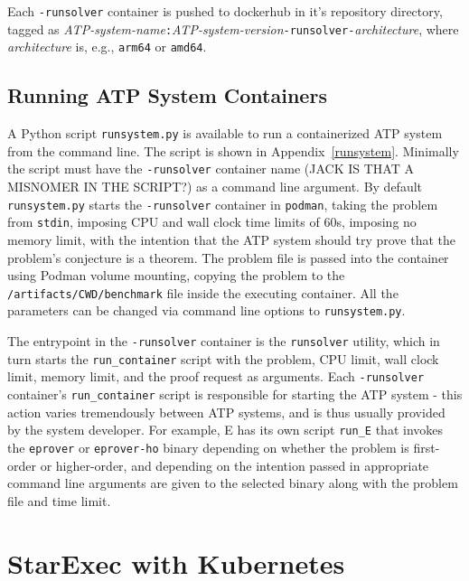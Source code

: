 \documentclass{easychair}
\begin{document}
Each {\tt -runsolver} container is pushed to dockerhub in it's repository directory, tagged
as {\em ATP-system-name}{\tt :}{\em ATP-system-version}{\tt -runsolver-}{\em architecture},
where {\em architecture} is, e.g., {\tt arm64} or {\tt amd64}.

\subsection{Running ATP System Containers}
\label{Running}

A Python script {\tt runsystem.py} is available to run a containerized ATP system from the 
command line.
The script is shown in Appendix~\ref{runsystem}.
Minimally the script must have the {\tt -runsolver} container name (JACK IS THAT A MISNOMER IN THE SCRIPT?)
as a command line argument.
By default {\tt runsystem.py} starts the {\tt -runsolver} container in {\tt podman}, taking the 
problem from {\tt stdin}, imposing CPU and wall clock time limits of 60s, imposing no memory 
limit, with the intention that the ATP system should try prove that the problem's conjecture is 
a theorem.
The problem file is passed into the container using Podman volume mounting, copying the
problem to the {\tt /artifacts/CWD/benchmark} file inside the executing container.
All the parameters can be changed via command line options to {\tt runsystem.py}.

The entrypoint in the {\tt -runsolver} container is the {\tt runsolver} utility, which in
turn starts the {\tt run\_container} script with the problem, CPU limit, wall clock limit, 
memory limit, and the proof request as arguments.
Each {\tt -runsolver} container's {\tt run\_container} script is responsible for starting the 
ATP system - this action varies tremendously between ATP systems, and is thus usually provided 
by the system developer.
For example, E has its own script {\tt run\_E} that invokes the {\tt eprover} or {\tt eprover-ho}
binary depending on whether the problem is first-order or higher-order, and depending on the
intention passed in appropriate command line arguments are given to the selected binary along
with the problem file and time limit.

\section{StarExec with Kubernetes}
\label{StarExecK}
\end{document}
